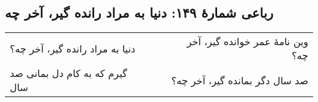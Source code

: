 \begin{center}
\section*{رباعی شمارهٔ ۱۴۹: دنیا به مراد رانده گیر، آخر چه}
\label{sec:149}
\begin{longtable}{l p{0.5cm} r}
دنیا به مراد رانده گیر، آخر چه؟
&&
وین نامهٔ عمر خوانده گیر، آخر چه؟
\\
گیرم که به کام دل بمانی صد سال
&&
صد سال دگر بمانده گیر، آخر چه؟
\\
\end{longtable}
\end{center}
